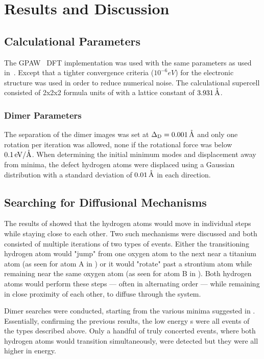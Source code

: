 \section{Results and Discussion}
\label{sec:perovskites-results}

\subsection{Calculational Parameters}
The GPAW~\cite{gpaw-review-2010} DFT implementation was used with the same parameters as used in~\cite{double-defect-2011}.
Except that a tighter convergence criteria ($10^{-6} \unit{eV}$) for the electronic structure was used in order to reduce numerical noise.
The calculational supercell consisted of 2x2x2 formula units of  with a lattice constant of $3.931\, \mathrm{\mathring{\mathrm{A}}}$.

\subsubsection{Dimer Parameters}
The separation of the dimer images was set at $\Delta_\text{D} = 0.001\, \mathrm{\mathring{\mathrm{A}}}$ and only one rotation per iteration was allowed, none if the rotational force was below $0.1\, \mathrm{eV/\mathring{\mathrm{A}}}$.
When determining the initial minimum modes and displacement away from minima, the defect hydrogen atoms were displaced using a Gaussian distribution with a standard deviation of $0.01 \, \mathrm{\mathring{\mathrm{A}}}$ in each direction.

\subsection{Searching for Diffusional Mechanisms}
The results of \cite{double-defect-2011} showed that the hydrogen atoms would move in individual steps while staying close to each other.
Two such mechanisms were discussed and both consisted of multiple iterations of two types of events.
Either the transitioning hydrogen atom would "jump" from one oxygen atom to the next near a titanium atom (as seen for atom A in ) or it would "rotate" past a strontium atom while remaining near the same oxygen atom (as seen for atom B in ).
Both hydrogen atoms would perform these steps --- often in alternating order --- while remaining in close proximity of each other, to diffuse through the system.

Dimer  searches were conducted, starting from the various minima suggested in \cite{double-defect-2011}.
Essentially, confirming the previous results, the low energy s were all events of the types described above.
Only a handful of truly concerted events, where both hydrogen atoms would transition simultaneously, were detected but they were all higher in energy.

